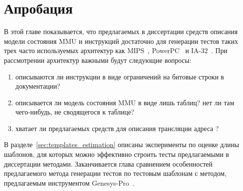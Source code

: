 \chapter{Апробация}

В этой главе показывается, что предлагаемых в диссертации средств
описания модели состояния MMU и инструкций достаточно для генерации
тестов таких трех часто используемых архитектур как MIPS~\cite{mips64II},
PowerPC~\cite{PowerPC} и IA-32~\cite{IA32}. При
рассмотрении архитектур важными будут следующие вопросы:
\begin{enumerate}
    \item описываются ли инструкции в виде ограничений на битовые
    строки в документации?
    \item описывается ли модель состояния MMU в виде лишь таблиц? нет ли там
чего-нибудь, не сводящегося к таблице?
    \item хватает ли предлагаемых средств для описания трансляции адреса ?
\end{enumerate}

В разделе~\ref{sec:templates_estimation} описаны эксперименты по оценке длины шаблонов, для
которых можно эффективно строить тесты предлагаемыми в диссертации
методами. Заканчивается глава
сравнением особенностей предлагаемого метода генерации тестов по
тестовым шаблонам с методом, предлагаемым инструментом
Genesys-Pro~\cite{GenesysPro}.





